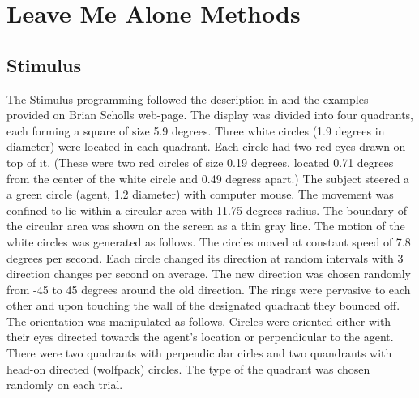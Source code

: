 \documentclass{article}
\begin{document}


  
 



\section{Leave Me Alone Methods}

\subsection{Stimulus}
The Stimulus programming followed the description in \citet{gao10} and the examples provided on Brian Scholls web-page. The display was divided into four quadrants, each forming a square of size 5.9 degrees. Three white circles (1.9 degrees in diameter) were located in each quadrant. Each circle had two red eyes drawn on top of it. (These were two red circles of size 0.19 degrees, located 0.71 degrees from the center of the white circle and 0.49 degress apart.) The subject steered a a green circle (agent, 1.2 diameter) with computer mouse. The movement was confined to lie within a circular area with 11.75 degrees radius. The boundary of the circular area was shown on the screen as a thin gray line. The motion of the white circles was generated as follows. The circles moved at constant speed of 7.8 degrees per second. Each circle changed its direction at random intervals with 3 direction changes per second on average. The new direction was chosen randomly from -45 to 45 degrees around the old direction. The rings were pervasive to each other and upon touching the wall of the designated quadrant they bounced off. \\
The orientation was manipulated as follows. Circles were oriented either with their eyes directed towards the agent's location or perpendicular to the agent. There were two quadrants with perpendicular cirles and two quandrants with head-on directed (wolfpack) circles. The type of the quadrant was chosen randomly on each trial. \\
\end{document}
